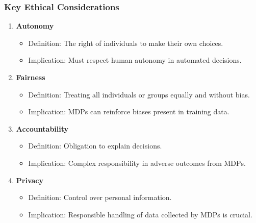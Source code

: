 \documentclass{beamer}
\begin{document}
\begin{frame}[fragile]
    \frametitle{Key Ethical Considerations}
    \begin{enumerate}
        \item \textbf{Autonomy}
            \begin{itemize}
                \item Definition: The right of individuals to make their own choices.
                \item Implication: Must respect human autonomy in automated decisions.
            \end{itemize}

        \item \textbf{Fairness}
            \begin{itemize}
                \item Definition: Treating all individuals or groups equally and without bias.
                \item Implication: MDPs can reinforce biases present in training data.
            \end{itemize}

        \item \textbf{Accountability}
            \begin{itemize}
                \item Definition: Obligation to explain decisions.
                \item Implication: Complex responsibility in adverse outcomes from MDPs.
            \end{itemize}

        \item \textbf{Privacy}
            \begin{itemize}
                \item Definition: Control over personal information.
                \item Implication: Responsible handling of data collected by MDPs is crucial.
            \end{itemize}
    \end{enumerate}
\end{frame}
\end{document}
